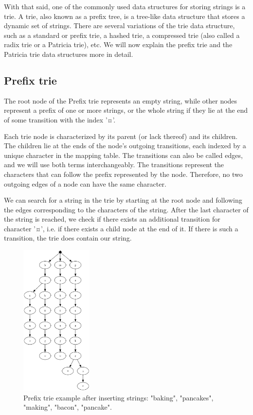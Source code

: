 \documentclass[essay]{fer}
\begin{document}
With that said, one of the commonly used data structures for storing strings is a trie. A trie, also known as a prefix tree, is a tree-like data structure that stores a dynamic set of strings.
There are several variations of the trie data structure, such as a standard or prefix trie, a hashed trie, a compressed trie (also called a radix trie or a Patricia trie), etc. We will now explain the prefix trie and the Patricia trie data structures more in detail.


\subsection{Prefix trie}
\label{sec:prefix_trie}

The root node of the Prefix trie represents an empty string, while other nodes represent a prefix of one or more strings, or the whole string if they lie at the end of some transition with the index '¤'.

Each trie node is characterized by its parent (or lack thereof) and its children. The children lie at the ends of the node's outgoing transitions, each indexed by a unique character in the mapping table. The transitions can also be called edges, and we will use both terms interchangeably.
The transitions represent the characters that can follow the prefix represented by the node.
Therefore, no two outgoing edges of a node can have the same character.

We can search for a string in the trie by starting at the root node and following the edges corresponding to the characters of the string.
After the last character of the string is reached, we check if there exists an additional transition for character '¤',
i.e. if there exists a child node at the end of it.
If there is such a transition, the trie does contain our string.

\begin{figure}[h]
  \label{fig:prefix_example}
  \centering
  \includegraphics[width=0.32\textwidth]{Figures/prefix_trie_small_after_insertion.png}
  \caption{Prefix trie example after inserting strings: "baking", "pancakes", "making", "bacon", "pancake".}
\end{figure}
\end{document}
